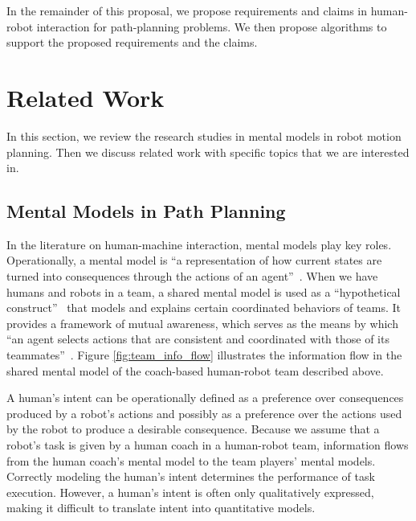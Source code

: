 \documentclass[phd]{byuprop}
\begin{document}
In the remainder of this proposal, we propose requirements and claims in human-robot interaction for path-planning problems.
We then propose algorithms to support the proposed requirements and the claims.

\section{Related Work}
\label{sec:related_work}

In this section, we review the research studies in mental models in robot motion planning.
Then we discuss related work with specific topics that we are interested in.

\subsection{Mental Models in Path Planning}
\label{sec:related_work:mental_models_in_path_planning}

In the literature on human-machine interaction, mental models play key roles.
Operationally, a mental model is ``a representation of how current states are turned into consequences through the actions of an agent''~\cite{gray2014manipulating}.
When we have humans and robots in a team, a shared mental model is used as a ``hypothetical construct''~\cite{Yen_implementingshared} that models and explains certain coordinated behaviors of teams.
It provides a framework of mutual awareness, which serves as the means by which ``an agent selects actions that are consistent and coordinated with those of its teammates''~\cite{nikolaidis2012human,FSS149109,Jonker:2010:SMM:2018118.2018128,Neerincx2011,Mathieu2000,Kennedy2007}.
Figure \ref{fig:team_info_flow} illustrates the information flow in the shared mental model of the coach-based human-robot team described above.

A human's intent can be operationally defined as a preference over consequences produced by a robot's actions and possibly as a preference over the actions used by the robot to produce a desirable consequence.
Because we assume that a robot's task is given by a human coach in a human-robot team, information flows from the human coach's mental model to the team players' mental models.
Correctly modeling the human's intent determines the performance of task execution.
However, a human's intent is often only qualitatively expressed, making it difficult to translate intent into quantitative models.
\end{document}

